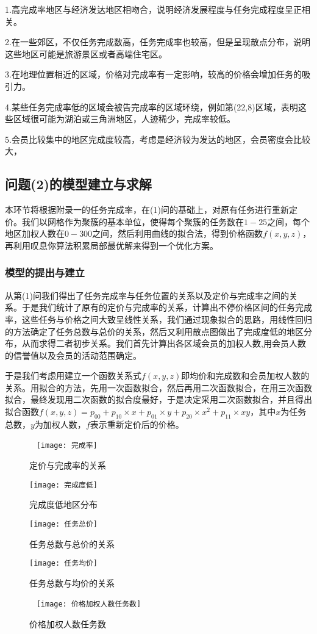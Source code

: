 \documentclass{ctexart}
\begin{document}
1.高完成率地区与经济发达地区相吻合，说明经济发展程度与任务完成程度呈正相关。

2.在一些郊区，不仅任务完成数高，任务完成率也较高，但是呈现散点分布，说明这些地区可能是旅游景区或者高端住宅区。

3.在地理位置相近的区域，价格对完成率有一定影响，较高的价格会增加任务的吸引力。

4.某些任务完成率低的区域会被告完成率的区域环绕，例如第(22,8)区域，表明这些区域很可能为湖泊或三角洲地区，人迹稀少，完成率较低。

5.会员比较集中的地区完成度较高，考虑是经济较为发达的地区，会员密度会比较大，


\subsection{问题(2)的模型建立与求解}
本环节将根据附录一的任务完成率，在(1)问的基础上，对原有任务进行重新定价。我们以网格作为聚簇的基本单位，使得每个聚簇的任务数在$1-25$之间，每个地区加权人数在$0-300$之间，然后利用曲线的拟合法，得到价格函数$f(x,y,z)$，再利用叹息你算法积累局部最优解来得到一个优化方案。
\subsubsection{模型的提出与建立}
从第(1)问我们得出了任务完成率与任务位置的关系以及定价与完成率之间的关系。于是我们统计了原有的定价与完成率的关系，计算出不停价格区间的任务完成率，这些任务与价格之间大致呈线性关系，我们通过现象拟合的思路，用线性回归的方法确定了任务总数与总价的关系，然后又利用散点图做出了完成度低的地区分布，从而求得二者初步关系。我们首先计算出各区域会员的加权人数,用会员人数的信誉值以及会员的活动范围确定。


于是我们考虑用建立一个函数关系式$f(x,y,z)$即均价和完成数和会员加权人数的关系。用拟合的方法，先用一次函数拟合，然后再用二次函数拟合，在用三次函数拟合，最终发现用二次函数的拟合度最好，于是决定采用二次函数拟合，并且得出拟合函数$f(x,y,z)=p_{00}+p_{10}\times x+ p_{01}\times y+p_{20}\times x^2+p_{11}\times xy$，其中$x$为任务总数，$y$为加权人数，$f$表示重新定价后的价格。
\begin{figure}[htbp]  
\centering
\texttt{[image: 完成率]} 
\caption{定价与完成率的关系}
\end{figure}
\begin{figure}[htbp] 
\centering
\texttt{[image: 完成度低]} 
\caption{完成度低地区分布}
\end{figure}
\begin{figure}[htbp] 
\centering
\texttt{[image: 任务总价]} 
\caption{任务总数与总价的关系}
\end{figure}
\begin{figure}[htbp] 
\centering
\texttt{[image: 任务均价]} 
\caption{任务总数与均价的关系}
\end{figure}
\begin{figure}[htbp]  
\centering
\texttt{[image: 价格加权人数任务数]} 
\caption{价格加权人数任务数}
\end{figure}
\newpage
\end{document}
